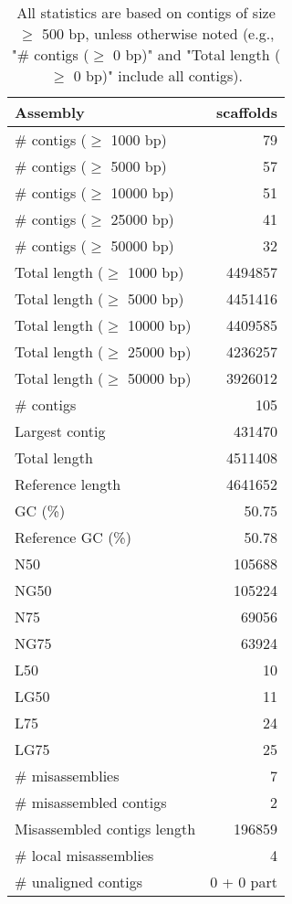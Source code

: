 \documentclass[12pt,a4paper]{article}
\begin{document}
\begin{table}[ht]
\begin{center}
\caption{All statistics are based on contigs of size $\geq$ 500 bp, unless otherwise noted (e.g., "\# contigs ($\geq$ 0 bp)" and "Total length ($\geq$ 0 bp)" include all contigs).}
\begin{tabular}{|l*{1}{|r}|}
\hline
Assembly & scaffolds \\ \hline
\# contigs ($\geq$ 1000 bp) & 79 \\ \hline
\# contigs ($\geq$ 5000 bp) & 57 \\ \hline
\# contigs ($\geq$ 10000 bp) & 51 \\ \hline
\# contigs ($\geq$ 25000 bp) & 41 \\ \hline
\# contigs ($\geq$ 50000 bp) & 32 \\ \hline
Total length ($\geq$ 1000 bp) & 4494857 \\ \hline
Total length ($\geq$ 5000 bp) & 4451416 \\ \hline
Total length ($\geq$ 10000 bp) & 4409585 \\ \hline
Total length ($\geq$ 25000 bp) & 4236257 \\ \hline
Total length ($\geq$ 50000 bp) & 3926012 \\ \hline
\# contigs & 105 \\ \hline
Largest contig & 431470 \\ \hline
Total length & 4511408 \\ \hline
Reference length & 4641652 \\ \hline
GC (\%) & 50.75 \\ \hline
Reference GC (\%) & 50.78 \\ \hline
N50 & 105688 \\ \hline
NG50 & 105224 \\ \hline
N75 & 69056 \\ \hline
NG75 & 63924 \\ \hline
L50 & 10 \\ \hline
LG50 & 11 \\ \hline
L75 & 24 \\ \hline
LG75 & 25 \\ \hline
\# misassemblies & 7 \\ \hline
\# misassembled contigs & 2 \\ \hline
Misassembled contigs length & 196859 \\ \hline
\# local misassemblies & 4 \\ \hline
\# unaligned contigs & 0 + 0 part \\ \hline

\end{tabular}
\end{center}
\end{table}
\end{document}
